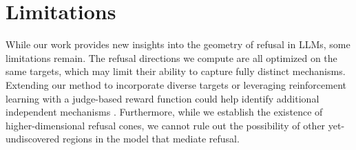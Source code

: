 \section{Limitations}
While our work provides new insights into the geometry of refusal in LLMs, some limitations remain. The refusal directions we compute are all optimized on the same targets, which may limit their ability to capture fully distinct mechanisms. Extending our method to incorporate diverse targets or leveraging reinforcement learning with a judge-based reward function could help identify additional independent mechanisms \cite{geisler_reinforce_2025}.
Furthermore, while we establish the existence of higher-dimensional refusal cones, we cannot rule out the possibility of other yet-undiscovered regions in the model that mediate refusal. %
